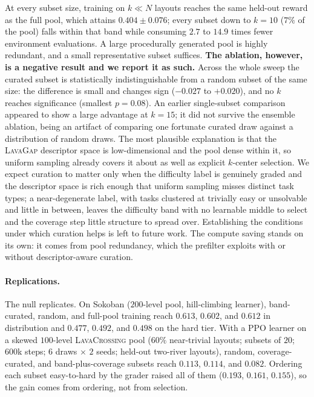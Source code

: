 \documentclass[twoside]{article}
\begin{document}
At every subset size, training on $k \ll N$ layouts reaches the same held-out reward as the full pool, which attains $0.404 \pm 0.076$; every subset down to $k=10$ ($7\%$ of the pool) falls within that band while consuming $2.7$ to $14.9$ times fewer environment evaluations. A large procedurally generated pool is highly redundant, and a small representative subset suffices. \textbf{The ablation, however, is a negative result and we report it as such.} Across the whole sweep the curated subset is statistically indistinguishable from a random subset of the same size: the difference is small and changes sign ($-0.027$ to $+0.020$), and no $k$ reaches significance (smallest $p = 0.08$). An earlier single-subset comparison appeared to show a large advantage at $k=15$; it did not survive the ensemble ablation, being an artifact of comparing one fortunate curated draw against a distribution of random draws. The most plausible explanation is that the \textsc{LavaGap} descriptor space is low-dimensional and the pool dense within it, so uniform sampling already covers it about as well as explicit $k$-center selection. We expect curation to matter only when the difficulty label is genuinely graded and the descriptor space is rich enough that uniform sampling misses distinct task types; a near-degenerate label, with tasks clustered at trivially easy or unsolvable and little in between, leaves the difficulty band with no learnable middle to select and the coverage step little structure to spread over. Establishing the conditions under which curation helps is left to future work. The compute saving stands on its own: it comes from pool redundancy, which the prefilter exploits with or without descriptor-aware curation.

\paragraph{Replications.} The null replicates. On Sokoban ($200$-level pool, hill-climbing learner), band-curated, random, and full-pool training reach $0.613$, $0.602$, and $0.612$ in distribution and $0.477$, $0.492$, and $0.498$ on the hard tier. With a PPO learner on a skewed $100$-level \textsc{LavaCrossing} pool ($60\%$ near-trivial layouts; subsets of $20$; $600$k steps; $6$ draws $\times$ $2$ seeds; held-out two-river layouts), random, coverage-curated, and band-plus-coverage subsets reach $0.113$, $0.114$, and $0.082$. Ordering each subset easy-to-hard by the grader raised all of them ($0.193$, $0.161$, $0.155$), so the gain comes from ordering, not from selection.
\end{document}
